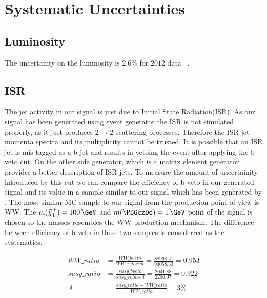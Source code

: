 \section{Systematic Uncertainties}
\label{sect:sys}
\subsection{Luminosity}
The uncertainty on the luminosity  is $2.6\%$ for $2012$ data ~\cite{LUMI}.

\subsection{ISR}
The jet activity in our signal is just due to Initial State Radiation(ISR). As our signal has been generated using \PYTHIA event generator the ISR is not simulated properly, as it just produces $2 \rightarrow 2$ scattering processes. Therefore the ISR jet momenta spectra and its multiplicity cannot be trusted. It is possible that an ISR jet is mis-tagged as a b-jet and results in vetoing the event after applying the b-veto cut. On the other side \MADGRAPH generator, which is a matrix element generator provides a better description of ISR jets. To measure the amount of uncertainity introduced by this cut we can compare the efficiency of b-veto in our generated signal and its value in a sample similar to our signal which has been generated by \MADGRAPH. 
The most similar MC sample to our signal from the production point of view is WW. The $m(\chione) = 100\,\GeV$ and $m(\PSGczDo) = 1\,\GeV$ point of the signal is chosen so the masses resembles the WW production mechanism. %
The difference between efficiency of b-veto in these two samples is considerred as the systematics.


\begin{align}
WW\_ratio &= \frac{WW\_bveto}{WW\_relaxed} = \frac{88968.51}{93058.33} = 0.953\\ \nonumber
susy\_ratio &= \frac{susy\_bveto}{susy\_relaxed} = \frac{2041.88}{2206.07} = 0.922 \\ \nonumber
A &= \frac{susy\_ratio - WW\_ratio}{WW\_ratio} = 3 \% \nonumber
\end{align}

